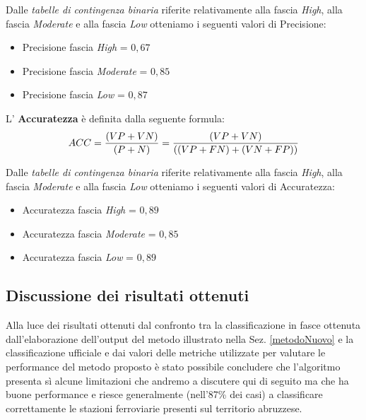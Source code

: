 Dalle \textit{tabelle di contingenza binaria} riferite relativamente alla fascia \textit{High}, alla fascia \textit{Moderate} e alla fascia \textit{Low} otteniamo i seguenti valori di Precisione:
\begin{itemize}
\item Precisione fascia \textit{High} = $0,67$
\item Precisione fascia \textit{Moderate} = $0,85$
\item Precisione fascia \textit{Low} = $0,87$
\end{itemize}

L' \textbf{Accuratezza} è definita dalla seguente formula:
\begin{equation}
ACC = {{(VP + VN)} \over {(P + N)} }= {{(VP + VN)} \over {((VP + FN) + (VN + FP))}}
\end{equation}

Dalle \textit{tabelle di contingenza binaria} riferite relativamente alla fascia \textit{High}, alla fascia \textit{Moderate} e alla fascia \textit{Low} otteniamo i seguenti valori di Accuratezza:
\begin{itemize}
\item Accuratezza fascia \textit{High} = $0,89$
\item Accuratezza fascia \textit{Moderate} = $0,85$
\item Accuratezza fascia \textit{Low} = $0,89$
\end{itemize}
\subsection{Discussione dei risultati ottenuti}
\label{discussioneRisultati}
Alla luce dei risultati ottenuti dal confronto tra la classificazione in fasce ottenuta dall'elaborazione dell'output del metodo illustrato nella Sez. \ref{metodoNuovo} e la classificazione ufficiale e dai valori delle metriche utilizzate per valutare le performance del metodo proposto è stato possibile concludere che l'algoritmo presenta sì alcune limitazioni che andremo a discutere qui di seguito ma che ha buone performance e riesce generalmente (nell'87\% dei casi) a classificare correttamente le stazioni ferroviarie presenti sul territorio abruzzese.

